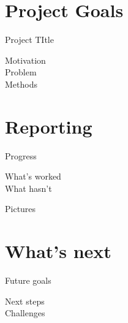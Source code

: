 \documentclass{beamer}
\begin{document}
\section{Project Goals}

\begin{frame}{Project TItle}

\begin{description}

\item[Motivation] 

\item[Problem] 

\item[Methods] 


\end{description}


\end{frame}
\section{Reporting}

\begin{frame}{Progress}


\begin{description}

\item[What's worked] 

\item[What hasn't] 

\end{description}

\end{frame}

\begin{frame}{Pictures}

\end{frame}


\section{What's next}



\begin{frame}{Future goals}

\begin{description}

\item[Next steps] 
\item[Challenges] 

\end{description}

\end{frame}
\end{document}
